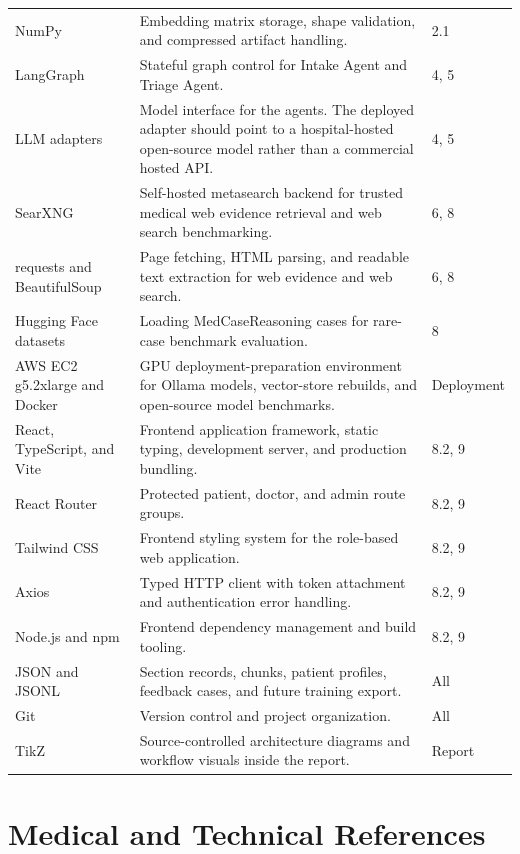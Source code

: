 \begin{longtable}{p{} p{} p{}}
NumPy & Embedding matrix storage, shape validation, and compressed artifact handling. & 2.1\\
LangGraph & Stateful graph control for Intake Agent and Triage Agent. & 4, 5\\
LLM adapters & Model interface for the agents. The deployed adapter should point to a hospital-hosted open-source model rather than a commercial hosted API. & 4, 5\\
SearXNG & Self-hosted metasearch backend for trusted medical web evidence retrieval and web search benchmarking. & 6, 8\\
requests and BeautifulSoup & Page fetching, HTML parsing, and readable text extraction for web evidence and web search. & 6, 8\\
Hugging Face datasets & Loading MedCaseReasoning cases for rare-case benchmark evaluation. & 8\\
AWS EC2 g5.2xlarge and Docker & GPU deployment-preparation environment for Ollama models, vector-store rebuilds, and open-source model benchmarks. & Deployment\\
React, TypeScript, and Vite & Frontend application framework, static typing, development server, and production bundling. & 8.2, 9\\
React Router & Protected patient, doctor, and admin route groups. & 8.2, 9\\
Tailwind CSS & Frontend styling system for the role-based web application. & 8.2, 9\\
Axios & Typed HTTP client with token attachment and authentication error handling. & 8.2, 9\\
Node.js and npm & Frontend dependency management and build tooling. & 8.2, 9\\
JSON and JSONL & Section records, chunks, patient profiles, feedback cases, and future training export. & All\\
Git & Version control and project organization. & All\\
TikZ & Source-controlled architecture diagrams and workflow visuals inside the report. & Report\\
\bottomrule
\end{longtable}

\section{Medical and Technical References}

